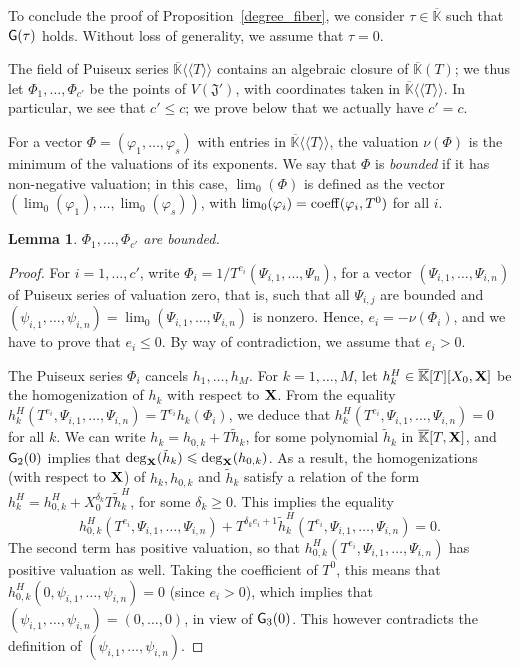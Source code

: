 \documentclass[11pt]{article}
\numberwithin{Property}{section}
\numberwithin{Theorem}{section}
\numberwithin{Proposition}{section}
\newtheorem{Lemma}{Lemma}%
\numberwithin{Lemma}{section}
\numberwithin{Corollary}{section}
\numberwithin{Definition}{section}
\numberwithin{Remark}{section}
\numberwithin{Conjecture}{section}
\numberwithin{Problem}{section}
\numberwithin{Claim}{section}
\theoremstyle{definition}
\numberwithin{Example}{section}
\renewcommand{\le}{\leqslant}
\renewcommand{\ge}{\geqslant}
\def\bar{\overline}
\renewcommand{\ge}{\geqslant} %
\renewcommand{\le}{\leqslant} %
\newcommand{\field}{\mathbb{K}} %
\newcommand{\mat}[1]{\mathbf{\MakeUppercase{#1}}} %
\begin{document}
To conclude the proof of Proposition~\ref{degree_fiber}, we
consider $\tau \in \bar{\field}$ such that ${\sf G}(\tau)$ holds. Without
loss of generality, we assume that $\tau=0$.

The field of Puiseux series $\bar{\field}\langle\langle T \rangle\rangle$
contains an algebraic closure of $\bar{\field}(T)$; we thus let
$\Phi_1,\dots,\Phi_{c'}$ be the points of $V(\mathfrak{J}')$, with
coordinates taken in $\bar{\field}\langle\langle T \rangle\rangle$. In
particular, we see that $c' \le c$; we prove below that we actually
have $c'=c$.

For a vector $\Phi=(\varphi_1,\dots,\varphi_s)$
with entries in $\bar{\field}\langle\langle T \rangle\rangle$, the valuation $\nu(\Phi)$ is the minimum of the valuations of its exponents. We say that $\Phi$ is {\em
  bounded} if it has non-negative valuation; in this case,
$\lim_0(\Phi)$ is defined as the vector
$(\lim_0(\varphi_1),\dots,\lim_0(\varphi_s))$, with
$\lim_0(\varphi_i)={\rm coeff}(\varphi_i,T^0)$ for all $i$.
\begin{Lemma}
   $\Phi_1,\dots,\Phi_{c'}$ are bounded.
\end{Lemma}
\begin{proof}
  For $i=1,\dots,c'$, write $\Phi_i=1/T^{e_i}
  (\Psi_{i,1},\dots,\Psi_{n})$, for a vector
  $(\Psi_{i,1},\dots,\Psi_{i,n})$ of Puiseux series of valuation
  zero, that is, such that all $\Psi_{i,j}$ are bounded and
  $(\psi_{i,1},\dots,\psi_{i,n})=\lim_0(\Psi_{i,1},\dots,\Psi_{i,n})$
  is nonzero. Hence,
  $e_i=-\nu(\Phi_i)$, and we have to prove that $e_i \le 0$.  By way
  of contradiction, we assume that $e_i > 0$.

  The Puiseux series $\Phi_i$ cancels $h_1,\dots,h_M$. For
  $k=1,\dots,M$, let $h_k^H \in \bar{\field}[T][X_0,\mat{X}]$ be the homogenization
  of $h_k$ with respect to $\mat{X}$. From the equality
  $h_k^H(T^{e_i},\Psi_{i,1},\dots,\Psi_{i,n})=
  T^{e_i}h_k(\Phi_i)$, we deduce that
  $h_k^H(T^{e_i},\Psi_{i,1},\dots,\Psi_{i,n})=0$ for all $k$. We
  can write $h_k = h_{0,k} + T \tilde h_k$, for some polynomial
  $\tilde h_k$ in $\bar{\field}[T,\mat{X}]$, and ${\sf G}_2(0)$ implies that
  $\deg_\mat{X}(\tilde h_k) \le \deg_\mat{X}(h_{0,k})$. As a result, the
  homogenizations (with respect to $\mat{X}$) of $h_{k},h_{0,k}$ and $\tilde
  h_k$ satisfy a relation of the form $h^H_k = h_{0,k}^H +
  X_0^{\delta_k} T \tilde h^H_k$, for some $\delta_k \ge 0$. This
  implies the equality
  $$h_{0,k}^H(T^{e_i},\Psi_{i,1},\dots,\Psi_{i,n}) + T^{\delta_k
    e_i+1}\tilde h_k^H(T^{e_i},\Psi_{i,1},\dots,\Psi_{i,n})=0.$$
  The second term has positive valuation, so that
  $h_{0,k}^H(T^{e_i},\Psi_{i,1},\dots,\Psi_{i,n})$ has positive
  valuation as well. Taking the coefficient of $T^0$, this means 
  that $h_{0,k}^H(0,\psi_{i,1},\dots,\psi_{i,n})=0$ (since $e_i > 0$), which implies 
  that $(\psi_{i,1},\dots,\psi_{i,n})=(0,\dots,0)$, in view of ${\sf G}_3(0)$.
  This however contradicts the definition of $(\psi_{i,1},\dots,\psi_{i,n})$.
\end{proof}
\end{document}
